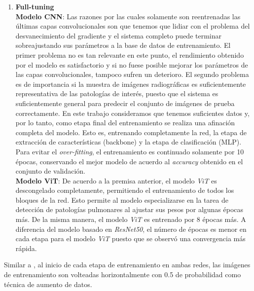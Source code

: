 \begin{enumerate}
    \item \textbf{Full-tuning}\\
        \textbf{Modelo CNN}: Las razones por las cuales solamente son reentrenadas las últimas capas
        convolucionales son que tenemos que lidiar con el problema del desvanecimiento del gradiente y el sistema
        completo puede terminar sobreajustando sus parámetros a la base de datos de entrenamiento. El primer
        problema no es tan relevante en este punto, el rendimiento obtenido por el modelo es satisfactorio y si no
        fuese posible mejorar los parámetros de las capas convolucionales, tampoco sufren un deterioro. El segundo
        problema es de importancia si la muestra de imágenes radiográficas es suficientemente representativa de las
        patologías de interés, puesto que el sistema es suficientemente general para predecir el conjunto de imágenes
        de prueba correctamente. En este trabajo consideramos que tenemos suficientes datos y, por lo tanto, como
        etapa final del entrenamiento se realiza una afinación completa del modelo. Esto es, entrenando completamente
        la red, la etapa de extracción de características (backbone) y la etapa de clasificación (MLP). Para evitar
        el \textit{over-fitting}, el entrenamiento es continuado solamente por 10 épocas, conservando el mejor modelo
        de acuerdo al \textit{accuracy} obtenido en el conjunto de validación.\\

        \textbf{Modelo ViT}: De acuerdo a la premisa anterior, el modelo \textit{ViT} es descongelado completamente,
        permitiendo el entrenamiento de todos los bloques de la red. Esto permite al modelo especializarse en la
        tarea de detección de patologías pulmonares al ajustar sus pesos por algunas épocas más. De la misma manera,
        el modelo \textit{ViT} es entrenado por 8 épocas más. A diferencia del modelo basado en \textit{ResNet50}, el
        número de épocas es menor en cada etapa para el modelo \textit{ViT} puesto que se observó una convergencia
        más rápida.


\end{enumerate}

Similar a \citeauthor{rajpurkar2018deep}, al inicio de cada etapa de entrenamiento en ambas redes,
las imágenes de entrenamiento son volteadas horizontalmente con 0.5 de probabilidad como técnica de
aumento de datos.

